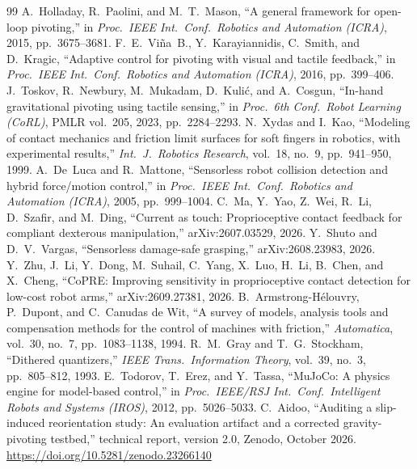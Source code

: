 \documentclass[11pt]{article}
\begin{document}
\begin{thebibliography}{99}\small
{} A.~Holladay, R.~Paolini, and M.~T.~Mason, ``A general framework for open-loop pivoting,'' in \emph{Proc.\ IEEE Int.\ Conf.\ Robotics and Automation (ICRA)}, 2015, pp.~3675--3681.
 F.~E.~Vi\~na~B., Y.~Karayiannidis, C.~Smith, and D.~Kragic, ``Adaptive control for pivoting with visual and tactile feedback,'' in \emph{Proc.\ IEEE Int.\ Conf.\ Robotics and Automation (ICRA)}, 2016, pp.~399--406.
 J.~Toskov, R.~Newbury, M.~Mukadam, D.~Kuli\'c, and A.~Cosgun, ``In-hand gravitational pivoting using tactile sensing,'' in \emph{Proc.\ 6th Conf.\ Robot Learning (CoRL)}, PMLR vol.~205, 2023, pp.~2284--2293.
 N.~Xydas and I.~Kao, ``Modeling of contact mechanics and friction limit surfaces for soft fingers in robotics, with experimental results,'' \emph{Int.\ J.\ Robotics Research}, vol.~18, no.~9, pp.~941--950, 1999.
 A.~De~Luca and R.~Mattone, ``Sensorless robot collision detection and hybrid force/motion control,'' in \emph{Proc.\ IEEE Int.\ Conf.\ Robotics and Automation (ICRA)}, 2005, pp.~999--1004.
 C.~Ma, Y.~Yao, Z.~Wei, R.~Li, D.~Szafir, and M.~Ding, ``Current as touch: Proprioceptive contact feedback for compliant dexterous manipulation,'' arXiv:2607.03529, 2026.
 Y.~Shuto and D.~V.~Vargas, ``Sensorless damage-safe grasping,'' arXiv:2608.23983, 2026.
 Y.~Zhu, J.~Li, Y.~Dong, M.~Suhail, C.~Yang, X.~Luo, H.~Li, B.~Chen, and X.~Cheng, ``CoPRE: Improving sensitivity in proprioceptive contact detection for low-cost robot arms,'' arXiv:2609.27381, 2026.
 B.~Armstrong-H\'elouvry, P.~Dupont, and C.~Canudas de Wit, ``A survey of models, analysis tools and compensation methods for the control of machines with friction,'' \emph{Automatica}, vol.~30, no.~7, pp.~1083--1138, 1994.
 R.~M.~Gray and T.~G.~Stockham, ``Dithered quantizers,'' \emph{IEEE Trans.\ Information Theory}, vol.~39, no.~3, pp.~805--812, 1993.
 E.~Todorov, T.~Erez, and Y.~Tassa, ``MuJoCo: A physics engine for model-based control,'' in \emph{Proc.\ IEEE/RSJ Int.\ Conf.\ Intelligent Robots and Systems (IROS)}, 2012, pp.~5026--5033.
 C.~Aidoo, ``Auditing a slip-induced reorientation study: An evaluation artifact and a corrected gravity-pivoting testbed,'' technical report, version 2.0, Zenodo, October 2026. \url{https://doi.org/10.5281/zenodo.23266140}
\end{thebibliography}
\end{document}
